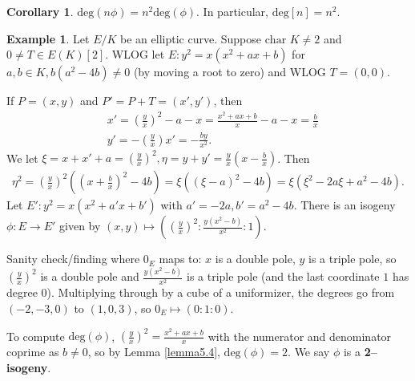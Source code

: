 \documentclass{article}
\theoremstyle{definition}
\newtheorem{cor}[theorem]{Corollary}
\newtheorem{example}[theorem]{Example}
\begin{document}
\begin{cor}\label{cor5.9}
    $\text{deg}(n \phi) = n^2 \text{deg}(\phi)$. In particular, $\text{deg}[n] = n^2$.
\end{cor}
\begin{example}
    Let $E/K$ be an elliptic curve. Suppose $\text{char }K\neq 2$ and $0\neq T \in E(K)[2]$. WLOG let $E: y^2 = x(x^2+ax+b)$ for $a,b \in K, b(a^2-4b)\neq 0$ (by moving a root to zero) and WLOG $T=(0,0)$. 
    \vspace{1mm}
     
    If $P = (x,y)$ and $P' = P+T = (x',y')$, then 
    \begin{align*}
        &x' = \left(\frac{y}{x}\right)^2-a-x = \frac{x^2+ax+b}{x}-a-x = \frac{b}{x}\\
        &y' = -\left(\frac{y}{x}\right)x' = -\frac{by}{x^2}.
    \end{align*}
    We let $\xi = x + x' + a = \left(\frac{y}{x}\right)^2, \eta = y + y' = \frac{y}{x}\left(x-\frac{b}{x}\right)$.
    Then 
    \begin{align*}
        \eta^2 = \left(\frac{y}{x}\right)^2\left(\left(x+\frac{b}{x}\right)^2-4b \right) = \xi((\xi-a)^2-4b) = \xi(\xi^2-2a\xi + a^2-4b).
    \end{align*}
    Let $E' : y^2 = x(x^2+a'x+b')$ with $a'=-2a, b' = a^2-4b$. There is an isogeny $\phi : E \to E'$ given by $(x,y) \mapsto \left(\left(\frac{y}{x}\right)^2 : \frac{y(x^2-b)}{x^2} : 1 \right)$.
    \vspace{1mm}
     
    Sanity check/finding where $0_E$ maps to: $x$ is a double pole, $y$ is a triple pole, so $\left(\frac{y}{x}\right)^2$ is a double pole and $\frac{y(x^2-b)}{x^2}$ is a triple pole (and the last coordinate $1$ has degree 0). Multiplying through by a cube of a uniformizer, the degrees go from $(-2,-3,0)$ to $(1,0,3)$, so $0_E \mapsto (0:1:0)$.
    \vspace{1mm}
     
    To compute $\text{deg}(\phi)$, $\left(\frac{y}{x}\right)^2 = \frac{x^2+ax+b}{x}$ with the numerator and denominator coprime as $b \neq 0$, so by Lemma \ref{lemma5.4}, $\text{deg}(\phi)=2$. We say $\phi$ is a \textbf{2--isogeny}.
\end{example}
\end{document}
